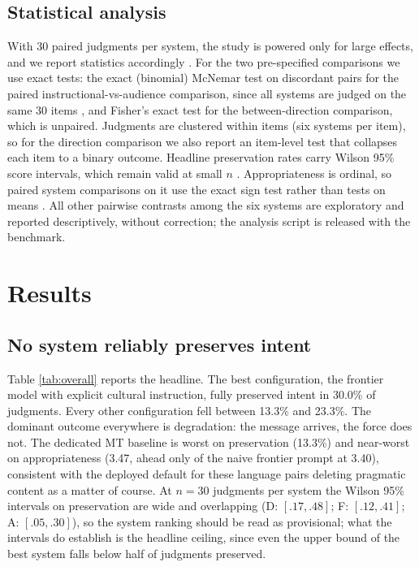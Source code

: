 \documentclass[11pt]{article}
\begin{document}
\subsection{Statistical analysis}
\label{sec:stats}
With 30 paired judgments per system, the study is powered only for large effects, and we report statistics accordingly \citep{card2020power}. For the two pre-specified comparisons we use exact tests: the exact (binomial) McNemar test on discordant pairs for the paired instructional-vs-audience comparison, since all systems are judged on the same 30 items \citep{dietterich1998}, and Fisher's exact test for the between-direction comparison, which is unpaired. Judgments are clustered within items (six systems per item), so for the direction comparison we also report an item-level test that collapses each item to a binary outcome. Headline preservation rates carry Wilson 95\% score intervals, which remain valid at small $n$ \citep{newcombe1998}. Appropriateness is ordinal, so paired system comparisons on it use the exact sign test rather than tests on means \citep{howcroft2021ordinal}. All other pairwise contrasts among the six systems are exploratory and reported descriptively, without correction; the analysis script is released with the benchmark.

\section{Results}

\subsection{No system reliably preserves intent}
Table \ref{tab:overall} reports the headline. The best configuration, the frontier model with explicit cultural instruction, fully preserved intent in 30.0\% of judgments. Every other configuration fell between 13.3\% and 23.3\%. The dominant outcome everywhere is degradation: the message arrives, the force does not. The dedicated MT baseline is worst on preservation (13.3\%) and near-worst on appropriateness (3.47, ahead only of the naive frontier prompt at 3.40), consistent with the deployed default for these language pairs deleting pragmatic content as a matter of course. At $n=30$ judgments per system the Wilson 95\% intervals on preservation are wide and overlapping (D: $[.17, .48]$; F: $[.12, .41]$; A: $[.05, .30]$), so the system ranking should be read as provisional; what the intervals do establish is the headline ceiling, since even the upper bound of the best system falls below half of judgments preserved.
\end{document}
